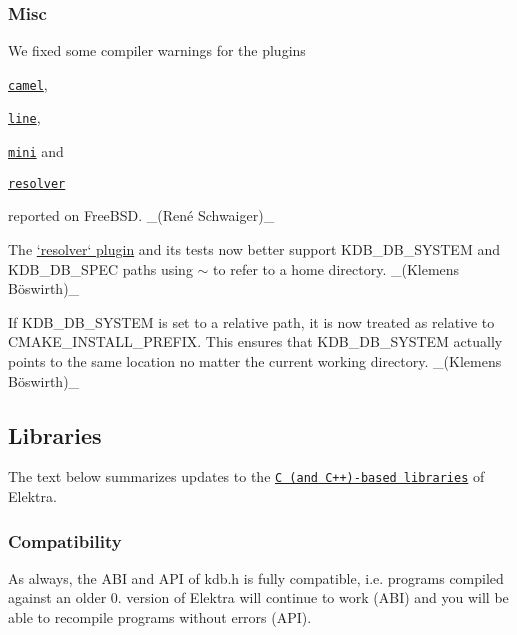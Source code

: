 \subsubsection*{Misc}


\begin{DoxyItemize}
\item We fixed some compiler warnings for the plugins
\begin{DoxyItemize}
\item \href{https://www.libelektra.org/plugins/camel}{\tt {\ttfamily camel}},
\item \href{https://www.libelektra.org/plugins/line}{\tt {\ttfamily line}},
\item \href{https://www.libelektra.org/plugins/mini}{\tt {\ttfamily mini}} and
\item \href{https://www.libelektra.org/plugins/resolver}{\tt {\ttfamily resolver}}
\end{DoxyItemize}

reported on Free\+B\+SD. \+\_\+(René Schwaiger)\+\_\+
\item The \hyperlink{md_src_plugins_resolver_README_src_plugins_resolver_README_md}{`resolver` plugin} and its tests now better support {\ttfamily K\+D\+B\+\_\+\+D\+B\+\_\+\+S\+Y\+S\+T\+EM} and {\ttfamily K\+D\+B\+\_\+\+D\+B\+\_\+\+S\+P\+EC} paths using {\ttfamily $\sim$} to refer to a home directory. \+\_\+(Klemens Böswirth)\+\_\+
\item If {\ttfamily K\+D\+B\+\_\+\+D\+B\+\_\+\+S\+Y\+S\+T\+EM} is set to a relative path, it is now treated as relative to {\ttfamily C\+M\+A\+K\+E\+\_\+\+I\+N\+S\+T\+A\+L\+L\+\_\+\+P\+R\+E\+F\+IX}. This ensures that {\ttfamily K\+D\+B\+\_\+\+D\+B\+\_\+\+S\+Y\+S\+T\+EM} actually points to the same location no matter the current working directory. \+\_\+(Klemens Böswirth)\+\_\+
\end{DoxyItemize}

\subsection*{Libraries}

The text below summarizes updates to the \href{https://www.libelektra.org/libraries/readme}{\tt C (and C++)-\/based libraries} of Elektra.

\subsubsection*{Compatibility}

As always, the A\+BI and A\+PI of kdb.\+h is fully compatible, i.\+e. programs compiled against an older 0. version of Elektra will continue to work (A\+BI) and you will be able to recompile programs without errors (A\+PI).


